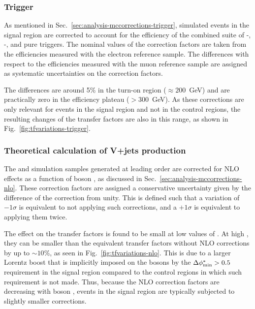\subsubsection{Trigger}
As mentioned in Sec.~\ref{sec:analysis-mccorrections-trigger}, simulated events 
in the signal region are corrected to account for the efficiency of the 
combined suite of \scalht-\alphat, \met-\mht, and pure \scalht triggers. The 
nominal values of the correction factors are taken from the efficiencies 
measured with the electron reference sample. The differences with respect to 
the efficiencies measured with the muon reference sample are assigned as 
systematic uncertainties on the correction factors. 

The differences are around 
5\% in the turn-on region (\mht$\approx200$~GeV) and are practically zero in 
the efficiency plateau (\mht$>300$~GeV). 
As these corrections are only relevant for events in the signal region and not 
in the control regions, the resulting changes of the transfer factors are also 
in this range, as shown in Fig.~\ref{fig:tfvariations-trigger}. 

\subsubsection{Theoretical calculation of V+jets production}
The \zj and \wj simulation samples generated at leading order are corrected for 
NLO effects as a function of boson \pt, as discussed in 
Sec.~\ref{sec:analysis-mccorrections-nlo}.
These correction factors are assigned a conservative uncertainty given by 
the difference of the correction from unity.
This is defined such that a variation of $-1\sigma$ 
is equivalent to not applying such corrections, and a $+1\sigma$ is equivalent 
to applying them twice.

The effect on the transfer factors is found to be small at low values of 
\scalht. At high \scalht, they can be smaller than the equivalent transfer 
factors without NLO corrections by up to $\sim10\%$, as seen in 
Fig.~\ref{fig:tfvariations-nlo}.
This is due to a larger Lorentz boost that is implicitly imposed 
on the bosons by the $\mbox{$\Delta\phi^{*}_{\mathrm{min}}$}>0.5$ requirement in the signal region compared to 
the control regions in which such requirement is not made. Thus, because the 
NLO correction factors are decreasing with boson \pt, events in the 
signal region are typically subjected to slightly smaller corrections.

